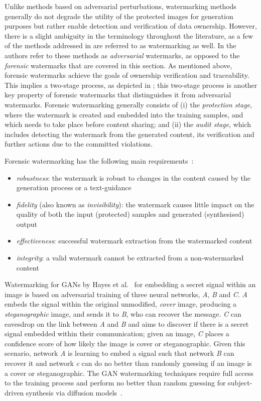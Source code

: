 \documentclass[conference,table]{IEEEtran} %
\begin{document}
Unlike methods based on adversarial perturbations, watermarking methods generally do not degrade the utility of the protected images for generation purposes but rather enable detection and verification of data ownership. 
However, there is a slight ambiguity in the terminology throughout the literature, as a few of the methods addressed in  are referred to as watermarking as well. 
In \cite{zhang_editguard_2023} the authors refer to these methods as \textit{adversarial} watermarks, as opposed to the \textit{forensic} watermarks that are covered in this section. 
As mentioned above, forensic watermarks achieve the goals of ownership verification and traceability. 
This implies a two-stage process, as depicted in ; this two-stage process is another key property of forensic watermarks that distinguishes it from adversarial watermarks.
Forensic watermarking generally consists of (i) the \textit{protection stage}, where the watermark is created and embedded into the training samples, and which needs to take place before content sharing; and (ii) the \textit{audit stage}, which includes detecting the watermark from the generated content, its verification and further actions due to the committed violations. 

Forensic watermarking has the following main requirements~\cite{lederer_identifying_2023}:
\begin{itemize}
    \item \textit{robustness}: the watermark is robust to changes in the content caused by the generation process or a text-guidance
    \item \textit{fidelity} (also known as \textit{invisibility}): the watermark causes little impact on the quality of both the input (protected) samples and generated (synthesised) output
    \item \textit{effectiveness}: successful watermark extraction from the watermarked content
    \item \textit{integrity}: a valid watermark cannot be extracted from a non-watermarked content
\end{itemize}

Watermarking for GANs by Hayes et al.~\cite{hayes_generating_2017} for embedding a secret signal within an image is based on adversarial training of three neural networks, \textit{A}, \textit{B} and \textit{C}. 
\textit{A} embeds the signal within the original unmodified, \textit{cover} image, producing a \textit{steganographic} image, and sends it to \textit{B}, who can recover the message. \textit{C} can eavesdrop on the link between \textit{A} and \textit{B} and aims to discover if there is a secret signal embedded within their communication; given an image, \textit{C} places a confidence score of how likely the image is cover or steganographic. 
Given this scenario, network \textit{A} is learning to embed a signal such that network \textit{B} can recover it and network \textit{c} can do no better than randomly guessing if an image is a cover or steganographic. 
The GAN watermarking techniques require full access to the training process and perform no better than random guessing for subject-driven synthesis via diffusion models~\cite{ma_generative_2023}. 
\end{document}
